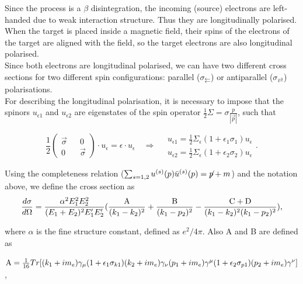 \documentclass[10pt,swedish, openany]{book}
\begin{document}
Since the process is a $\beta$ disintegration, the incoming (source) electrons are left-handed due to weak interaction structure. Thus they are longitudinally polarised.\\

When the target is placed inside a magnetic field, their spins of the electrons of the target are aligned with the field, so the target electrons are also longitudinal polarised.\\

Since both electrons are longitudinal polarised, we can have two different cross sections for two different spin configurations: parallel ($\sigma_{\leftleftarrows}$) or antiparallel ($\sigma_{\rightleftarrows}$) polarisations.\\

For describing the longitudinal polarisation, it is necessary to impose that the spinors $u_{\epsilon1}$ and $u_{\epsilon2}$ are eigenstates of the spin operator $\frac{1}{2}\Sigma = \sigma \frac{p}{|\vec{p}|}$, such that

\begin{equation}
\frac{1}{2}
   \begin{pmatrix}
   \vec{\sigma} && 0 \\
   0 && \vec{\sigma}
   \end{pmatrix} \cdot u_{\epsilon} = \epsilon \cdot u_{\epsilon} \quad \Rightarrow \quad \begin{matrix} u_{\epsilon 1} = \frac{1}{2} \Sigma_{\epsilon} (1+\epsilon_1 \sigma_1) u_{\epsilon}\\
   u_{\epsilon 2} = \frac{1}{2} \Sigma_{\epsilon} (1+\epsilon_2 \sigma_2) u_{\epsilon}
   \end{matrix}.
\end{equation}

Using the completeness relation ($\sum_{s=1,2} u^{(s)}(p) \bar{u}^{(s)}(p) =  \displaystyle{\not} p + m
$) and the notation above, we define the cross section as
\begin{equation}
    \frac{d\sigma}{d\Omega} = \frac{\alpha^2 E_1^2E_2^2}{(E_1+E_2)^2 E_1'E_2'} (\frac{\rm A}{(k_1 - k_2)^2} + \frac{\rm B}{(k_1 - p_2)^2} - \frac{\rm C+D}{(k_1 - k_2)^2(k_1 - p_2)^2}),
\end{equation}

where $\alpha$ is the fine structure constant, defined as $e^2/4\pi$. Also A and B are defined as 

\centerline{${\rm A} =  \frac{1}{16} Tr[(k_1+im_e)\gamma_{\mu}(1+\epsilon_1\sigma_{k1})(k_2+im_e)\gamma_{\nu}(p_1+im_e)\gamma^{\mu}(1+\epsilon_2\sigma_{p1})(p_2+im_e)\gamma^{\nu}]$,}
\end{document}
